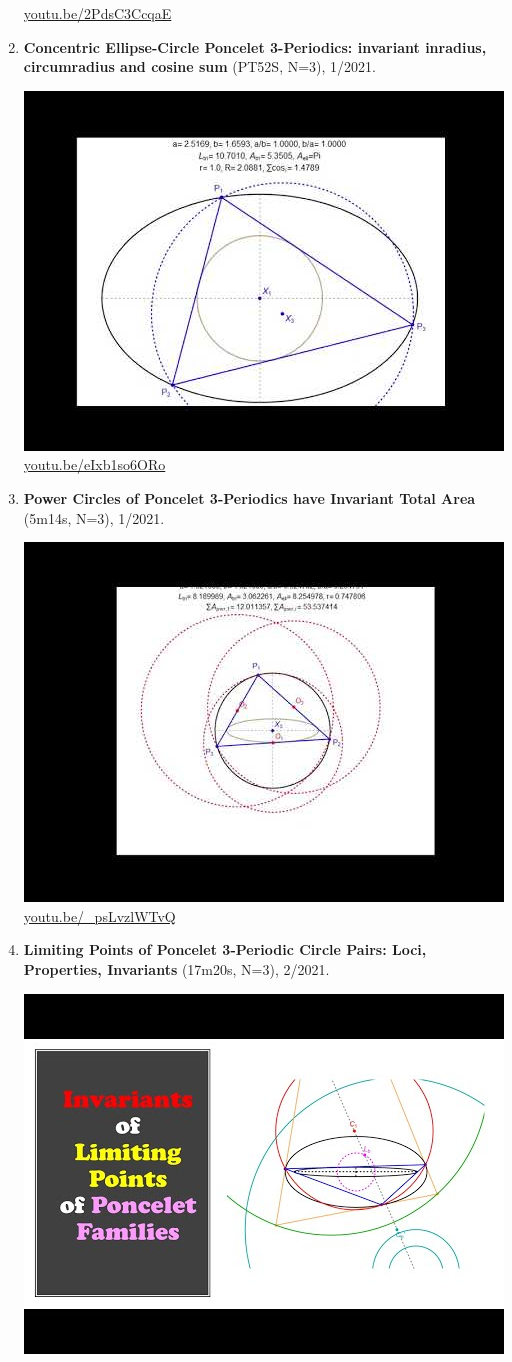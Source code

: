 \documentclass[12pt]{amsart}
\begin{document}
\begin{enumerate}[resume]
\begin{center}
\href{https://youtu.be/2PdsC3CcqaE}{\url{youtu.be/2PdsC3CcqaE}}\end{center}
% 
\item \textbf{Concentric Ellipse-Circle Poncelet 3-Periodics: invariant inradius, circumradius and cosine sum} (PT52S, N=3), 1/2021. 
\begin{center}\includegraphics[width=.5\textwidth]{pics/eIxb1so6ORo.jpg} \\ 
\href{https://youtu.be/eIxb1so6ORo}{\url{youtu.be/eIxb1so6ORo}}\end{center}
% 
\item \textbf{Power Circles of Poncelet 3-Periodics have Invariant Total Area} (5m14s, N=3), 1/2021. 
\begin{center}\includegraphics[width=.5\textwidth]{pics/_psLvzlWTvQ.jpg} \\ 
\href{https://youtu.be/_psLvzlWTvQ}{\url{youtu.be/\_psLvzlWTvQ}}\end{center}
% 
\item \textbf{Limiting Points of Poncelet 3-Periodic Circle Pairs: Loci, Properties, Invariants} (17m20s, N=3), 2/2021. 
\begin{center}\includegraphics[width=.5\textwidth]{pics/bHTLS2XzkIQ.jpg} \\ 

\end{center}
\end{enumerate}
\end{document}
